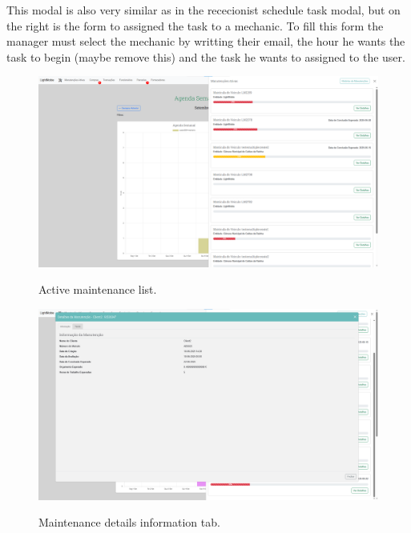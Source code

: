 This modal is also very similar as in the rececionist schedule task modal, but on the right is the form to assigned the task to a mechanic. 
To fill this form the manager must select the mechanic by writting their email, the hour he wants the task to begin (maybe remove this) and the task he wants to assigned to the user.

\begin{figure}[h]
  \caption{Active maintenance list.}
  \centering
  \includegraphics[width=\textwidth]{figs/Implementation/workshopmanager/maintenanceList}
  \label{fig:figure2}
\end{figure}


\begin{figure}[h]
  \caption{Maintenance details information tab.}
  \centering
  \includegraphics[width=\textwidth]{figs/Implementation/workshopmanager/maintenanceDetails}
  \label{fig:figure2}
\end{figure}

